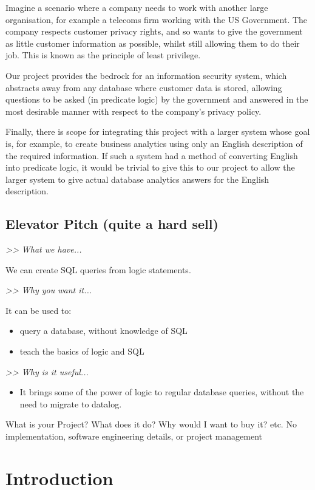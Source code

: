 \documentclass[a4paper, 11pt]{article}
\begin{document}
  Imagine a scenario where a company needs to work with another large
  organisation, for example a telecoms firm working with the US Government. The
  company respects customer privacy rights, and so wants to give the government
  as little customer information as possible, whilst still allowing them to do
  their job. This is known as the principle of least privilege.

  Our project provides the bedrock for an information security system, which
  abstracts away from any database where customer data is stored, allowing
  questions to be asked (in predicate logic) by the government and answered in
  the most desirable manner with respect to the company's privacy policy.

  Finally, there is scope for integrating this project with a larger system
  whose goal is, for example, to create business analytics using only an
  English description of the required information. If such a system had a
  method of converting English into predicate logic, it would be trivial to
  give this to our project to allow the larger system to give actual database
  analytics answers for the English description.

  \subsection*{Elevator Pitch (quite a hard sell)}
  \emph{>> What we have...}
  
  We can create SQL queries from logic statements.
  
  \emph{>> Why you want it...}

   It can be used to:
   \begin{itemize}
     \item query a database, without knowledge of SQL
     \item teach the basics of logic and SQL
   \end{itemize}

   \emph{>> Why is it useful...}
   \begin{itemize}
     \item It brings some of the power of logic to regular database queries,
     without the need to migrate to datalog.
    \end{itemize}

  What is your Project? What does it do? Why would I want to buy it? etc.
  No implementation, software engineering details, or project management

\section{Introduction}
\end{document}
